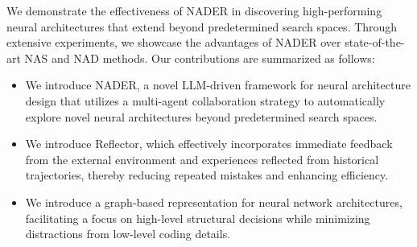 We demonstrate the effectiveness of NADER in discovering high-performing neural architectures that extend beyond predetermined search spaces. Through extensive experiments, we showcase the advantages of NADER over state-of-the-art NAS and NAD methods. Our contributions are summarized as follows:
\begin{itemize}
    \item We introduce NADER, a novel LLM-driven framework for neural architecture design that utilizes a multi-agent collaboration strategy to automatically explore novel neural architectures beyond predetermined search spaces. 
    \item  We introduce Reflector, which effectively incorporates immediate feedback from the external environment and experiences reflected from historical trajectories, thereby reducing repeated mistakes and enhancing efficiency.
    \item We introduce a graph-based representation for neural network architectures, facilitating a focus on high-level structural decisions while minimizing distractions from low-level coding details.
\end{itemize}




